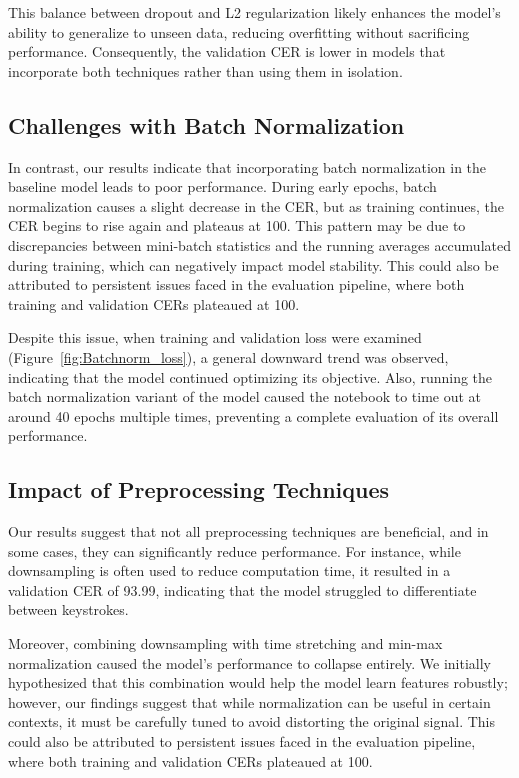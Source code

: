 \documentclass{article}
\begin{document}
This balance between dropout and L2 regularization likely enhances the model’s ability to generalize to unseen data, reducing overfitting without sacrificing performance. Consequently, the validation CER is lower in models that incorporate both techniques rather than using them in isolation.

\subsection{Challenges with Batch Normalization}
In contrast, our results indicate that incorporating batch normalization in the baseline model leads to poor performance. During early epochs, batch normalization causes a slight decrease in the CER, but as training continues, the CER begins to rise again and plateaus at 100. This pattern may be due to discrepancies between mini-batch statistics and the running averages accumulated during training, which can negatively impact model stability. This could also be attributed to persistent issues faced in the evaluation pipeline, where both training and validation CERs plateaued at 100. 

Despite this issue, when training and validation loss were examined (Figure~\ref{fig:Batchnorm_loss}), a general downward trend was observed, indicating that the model continued optimizing its objective. Also, running the batch normalization variant of the model caused the notebook to time out at around 40 epochs multiple times, preventing a complete evaluation of its overall performance.

\subsection{Impact of Preprocessing Techniques}
Our results suggest that not all preprocessing techniques are beneficial, and in some cases, they can significantly reduce performance. For instance, while downsampling is often used to reduce computation time, it resulted in a validation CER of 93.99, indicating that the model struggled to differentiate between keystrokes.

Moreover, combining downsampling with time stretching and min-max normalization caused the model’s performance to collapse entirely. We initially hypothesized that this combination would help the model learn features robustly; however, our findings suggest that while normalization can be useful in certain contexts, it must be carefully tuned to avoid distorting the original signal. This could also be attributed to persistent issues faced in the evaluation pipeline, where both training and validation CERs plateaued at 100.
\end{document}

